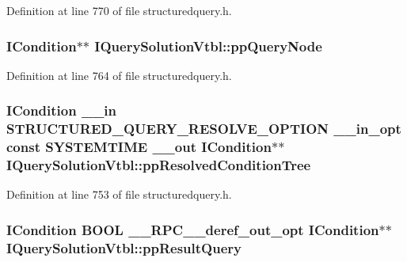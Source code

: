 Definition at line 770 of file structuredquery.\+h.

\subsubsection[{\texorpdfstring{pp\+Query\+Node}{ppQueryNode}}]{ {\bf I\+Condition}$\ast$$\ast$ I\+Query\+Solution\+Vtbl\+::pp\+Query\+Node}\hypertarget{struct_i_query_solution_vtbl_a3fc4fbc087f21ba63ffe2812a67cb0c3}{}\label{struct_i_query_solution_vtbl_a3fc4fbc087f21ba63ffe2812a67cb0c3}


Definition at line 764 of file structuredquery.\+h.

\subsubsection[{\texorpdfstring{pp\+Resolved\+Condition\+Tree}{ppResolvedConditionTree}}]{ {\bf I\+Condition} {\bf \+\_\+\+\_\+in} {\bf S\+T\+R\+U\+C\+T\+U\+R\+E\+D\+\_\+\+Q\+U\+E\+R\+Y\+\_\+\+R\+E\+S\+O\+L\+V\+E\+\_\+\+O\+P\+T\+I\+ON} {\bf \+\_\+\+\_\+in\+\_\+opt} {\bf const} S\+Y\+S\+T\+E\+M\+T\+I\+ME {\bf \+\_\+\+\_\+out} {\bf I\+Condition}$\ast$$\ast$ I\+Query\+Solution\+Vtbl\+::pp\+Resolved\+Condition\+Tree}\hypertarget{struct_i_query_solution_vtbl_a40b1018a81473bc0d582d2d12fe39acd}{}\label{struct_i_query_solution_vtbl_a40b1018a81473bc0d582d2d12fe39acd}


Definition at line 753 of file structuredquery.\+h.

\subsubsection[{\texorpdfstring{pp\+Result\+Query}{ppResultQuery}}]{ {\bf I\+Condition} {\bf B\+O\+OL} {\bf \+\_\+\+\_\+\+R\+P\+C\+\_\+\+\_\+deref\+\_\+out\+\_\+opt} {\bf I\+Condition}$\ast$$\ast$ I\+Query\+Solution\+Vtbl\+::pp\+Result\+Query}\hypertarget{struct_i_query_solution_vtbl_ad82600a4bf3c7d012e27712e97cce4d6}{}\label{struct_i_query_solution_vtbl_ad82600a4bf3c7d012e27712e97cce4d6}


